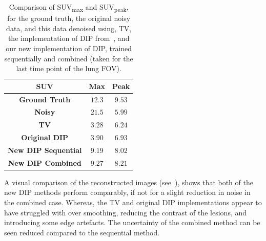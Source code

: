         \begin{table}
            \centering
            
            \captionsetup{singlelinecheck=false}
            \caption{
                Comparison of \gls{SUV}\textsubscript{max} and \gls{SUV}\textsubscript{peak}, for the ground truth, the original noisy data, and this data denoised using, \gls{TV}, the implementation of \gls{DIP} from~\parencite{Gong2019PETPrior}, and our new implementation of \gls{DIP}, trained sequentially and combined (taken for the last time point of the lung \gls{FOV}).
            }
            
            \resizebox*{1.0\linewidth}{!}
            {
                \begin{tabular}{||c|cc||}
                    \hline
                    \textbf{SUV}                & \textbf{Max}  & \textbf{Peak} \\
                    \hline
                    \textbf{Ground Truth}       & $12.3$        & $9.53$ \\
                    \hline
                    \textbf{Noisy}              & $21.5$        & $5.99$ \\
                    \hline
                    \textbf{TV}                 & $3.28$        & $6.24$ \\
                    \textbf{Original DIP}       & $3.90$        & $6.93$ \\
                    \hline
                    \textbf{New DIP Sequential} & $9.19$        & $8.02$ \\
                    \textbf{New DIP Combined}   & $9.27$        & $8.21$ \\
                    \hline
                \end{tabular}
            }
            \label{tab:pseudo_bayesian_dip_denoising_as_a_preprocessing_step_for_kinetic_modelling_in_dynamic_pet_appendix_results_suv}
        \end{table}
        
        A visual comparison of the reconstructed images (see~), shows that both of the new \gls{DIP} methods perform comparably, if not for a slight reduction in noise in the combined case. Whereas, the \gls{TV} and original \gls{DIP} implementations appear to have struggled with over smoothing, reducing the contrast of the lesions, and introducing some edge artefacts. The uncertainty of the combined method can be seen reduced compared to the sequential method.
        
